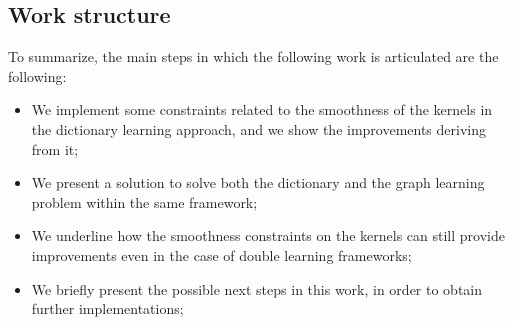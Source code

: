 \subsection{Work structure}
To summarize, the main steps in which the following work is articulated are the following:
\begin{itemize}
\item We implement some constraints related to the smoothness of the kernels in the dictionary learning approach, and we show the improvements deriving from it;
\item We present a solution to solve both the dictionary and the graph learning problem within the same framework;
\item We underline how the smoothness constraints on the kernels can still provide improvements even in the case of double learning frameworks;
\item We briefly present the possible next steps in this work, in order to obtain further implementations;
\end{itemize}
